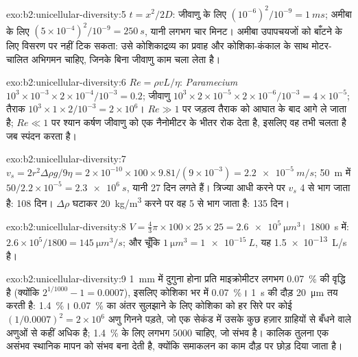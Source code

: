 \begin{solution}{exo:b2:unicellular-diversity:5}
$t = x^2/2D$: जीवाणु के लिए $(10^{-6})^2/10^{-9} = \qty{1}{ms}$;
अमीबा के लिए $(5\times 10^{-4})^2/10^{-9} = \qty{250}{s}$, यानी लगभग
चार मिनट। अमीबा उपापचयजों को बाँटने के लिए विसरण पर नहीं टिक सकता: उसे
कोशिकाद्रव्य का प्रवाह और कोशिका-कंकाल के साथ मोटर-चालित अभिगमन चाहिए,
जिनके बिना जीवाणु काम चला लेता है।
\end{solution}

\begin{solution}{exo:b2:unicellular-diversity:6}
$Re = \rho vL/\eta$: \emph{Paramecium} $10^3\times 10^{-3}\times
2\times 10^{-4}/10^{-3} = 0.2$; जीवाणु $10^3\times 2\times
10^{-5}\times 2\times 10^{-6}/10^{-3} = 4\times 10^{-5}$; तैराक
$10^3\times 1\times 2/10^{-3} = 2\times 10^6$। $Re \gg 1$ पर जड़त्व
तैराक को आघात के बाद आगे ले जाता है; $Re \ll 1$ पर श्यान कर्षण
जीवाणु को एक नैनोमीटर के भीतर रोक देता है, इसलिए वह तभी चलता है जब
स्पंदन करता है।
\end{solution}

\begin{solution}{exo:b2:unicellular-diversity:7}
$v_s = 2r^2\Delta\rho g/9\eta = 2\times 10^{-10}\times 100\times
9.81/(9\times 10^{-3}) = \qty{2.2e-5}{m/s}$; \qty{50}{m} में
$50/2.2\times 10^{-5} = \qty{2.3e6}{s}$, यानी 27 दिन लगते हैं। त्रिज्या
आधी करने पर $v_s$ 4 से भाग जाता है: 108 दिन। $\Delta\rho$ घटाकर
\qty{20}{kg/m^3} करने पर वह 5 से भाग जाता है: 135 दिन।
\end{solution}

\begin{solution}{exo:b2:unicellular-diversity:8}
$V = \tfrac{4}{3}\pi\times 100\times 25\times 25 =
\qty{2.6e5}{\micro m^3}$। \qty{1800}{s} में: $2.6\times 10^5/1800 =
\qty{145}{\micro m^3/s}$; और चूँकि $\qty{1}{\micro m^3} =
\qty{1e-15}{L}$, यह \qty{1.5e-13}{L/s} है।
\end{solution}

\begin{solution}{exo:b2:unicellular-diversity:9}
\qty{1}{mm} में दुगुना होना प्रति माइक्रोमीटर लगभग \qty{0.07}{\%} की
वृद्धि है (क्योंकि $2^{1/1000} - 1 = 0.0007$), इसलिए कोशिका भर में
\qty{0.07}{\%}। \qty{1}{s} की दौड़ \qty{20}{\micro m} तय करती है:
\qty{1.4}{\%}। \qty{0.07}{\%} का अंतर सुलझाने के लिए कोशिका को हर सिरे
पर कोई $(1/0.0007)^2 = 2\times 10^6$ अणु गिनने पड़ते, जो एक सेकंड में
उसके कुछ हज़ार ग्राहियों से बँधने वाले अणुओं से कहीं अधिक है;
\qty{1.4}{\%} के लिए लगभग \num{5000} चाहिए, जो संभव है। कालिक तुलना
एक असंभव स्थानिक मापन को संभव बना देती है, क्योंकि समाकलन का काम दौड़
पर छोड़ दिया जाता है।
\end{solution}

